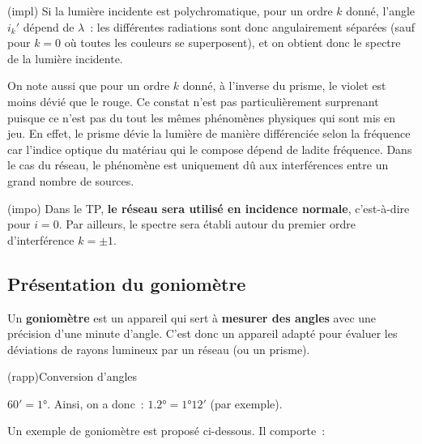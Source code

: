 \documentclass[../main/main.tex]{subfiles}
\begin{document}
{\begin{tcb}(impl){}
  Si la lumière incidente est polychromatique, pour un ordre $k$ donné, l'angle
  $i_{k}'$ dépend de $\lambda$~: les différentes radiations sont donc
  angulairement séparées (sauf pour $k = 0$ où toutes les couleurs se
  superposent), et on obtient donc le spectre de la lumière incidente.
\end{tcb}

On note aussi que pour un ordre $k$ donné, à l'inverse du prisme, le violet est
moins dévié que le rouge. Ce constat n'est pas particulièrement surprenant
puisque ce n'est pas du tout les mêmes phénomènes physiques qui sont mis en jeu.
En effet, le prisme dévie la lumière de manière différenciée selon la fréquence
car l'indice optique du matériau qui le compose dépend de ladite fréquence. Dans
le cas du réseau, le phénomène est uniquement dû aux interférences entre un
grand nombre de sources.

\begin{tcb}(impo){}
  Dans le TP, \textbf{le réseau sera utilisé en incidence normale}, c'est-à-dire
  pour $i = 0$. Par ailleurs, le spectre sera établi autour du premier ordre
  d'interférence $k = \pm 1$.
\end{tcb}

\subsection{Présentation du goniomètre}

Un \textbf{goniomètre} est un appareil qui sert à \textbf{mesurer des angles}
avec une précision d'une minute d'angle. C'est donc un appareil adapté pour
évaluer les déviations de rayons lumineux par un réseau (ou un prisme).

\begin{tcb}(rapp){Conversion d'angles}
  \begin{center}
      $\ang{;60;} = \ang{1;;}$.
      Ainsi, on a donc~: $\ang{1.2;;}= \ang{1;12;}$ (par exemple).
  \end{center}
\end{tcb}

Un exemple de goniomètre est proposé ci-dessous. Il comporte~: 

}
\end{document}
